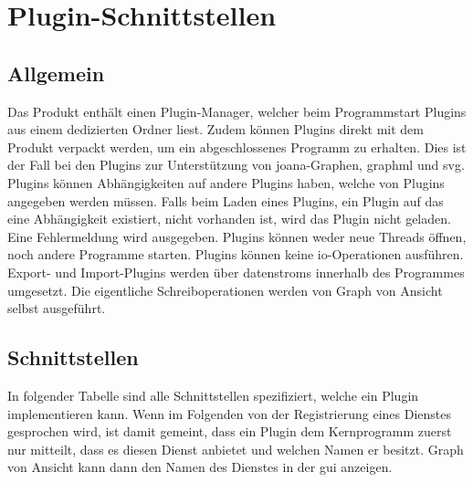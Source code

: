 \chapter{Plugin-Schnittstellen}
\label{ch:plugschnitt}

\setcounter{psnr}{10}
\newcommand{\psno}[1]{\subsubsection{#1}\addtocounter{psnr}{10}}
\renewcommand\thesubsubsection{/S\ifnum\value{psnr}<10 00\else\ifnum\value{psnr}<100 0\fi\fi\arabic{psnr}/}

\section{Allgemein}

Das Produkt enthält einen Plugin-Manager, welcher beim Programmstart Plugins aus einem dedizierten Ordner liest.
Zudem können Plugins direkt mit dem Produkt verpackt werden, um ein abgeschlossenes Programm zu erhalten.
Dies ist der Fall bei den Plugins zur Unterstützung von \gls{joana}-Graphen, \gls{graphml} und \gls{svg}.
Plugins können Abhängigkeiten auf andere Plugins haben, welche von Plugins angegeben werden müssen.
Falls beim Laden eines Plugins, ein Plugin auf das eine Abhängigkeit existiert, nicht vorhanden ist, wird das Plugin
nicht geladen. Eine Fehlermeldung wird ausgegeben.
Plugins können weder neue Threads öffnen, noch andere Programme starten. Plugins können keine \gls{io}-Operationen ausführen.
Export- und Import-Plugins werden über \glspl{datenstrom} innerhalb des Programmes umgesetzt. Die eigentliche Schreiboperationen
werden von Graph von Ansicht selbst ausgeführt.\\

\section{Schnittstellen}
In folgender Tabelle sind alle Schnittstellen spezifiziert, welche ein Plugin implementieren kann.
Wenn im Folgenden von der Registrierung eines Dienstes gesprochen wird, ist damit gemeint, dass ein Plugin dem Kernprogramm zuerst nur mitteilt, dass es diesen Dienst anbietet und welchen Namen er besitzt. Graph von Ansicht kann dann den Namen des Dienstes in der \gls{gui} anzeigen.

